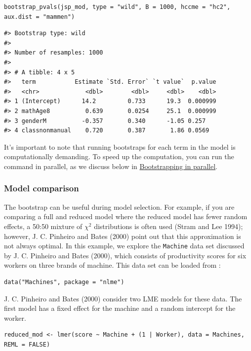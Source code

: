 \begin{verbatim}
bootstrap_pvals(jsp_mod, type = "wild", B = 1000, hccme = "hc2", aux.dist = "mammen")
\end{verbatim}

\begin{verbatim}
#> Bootstrap type: wild 
#> 
#> Number of resamples: 1000 
#> 
#> # A tibble: 4 x 5
#>   term           Estimate `Std. Error` `t value`  p.value
#>   <chr>             <dbl>        <dbl>     <dbl>    <dbl>
#> 1 (Intercept)      14.2         0.733      19.3  0.000999
#> 2 mathAge8          0.639       0.0254     25.1  0.000999
#> 3 genderM          -0.357       0.340      -1.05 0.257   
#> 4 classnonmanual    0.720       0.387       1.86 0.0569
\end{verbatim}

It's important to note that running bootstraps for each term in the model is computationally demanding. To speed up the computation, you can run the command in parallel, as we discuss below in \protect\hyperlink{bootstrapping-in-parallel}{Bootstrapping in parallel}.

\hypertarget{model-comparison}{%
\subsubsection{Model comparison}\label{model-comparison}}

The bootstrap can be useful during model selection.
For example, if you are comparing a full and reduced model where the reduced model has fewer random effects, a 50:50 mixture of \(\chi^2\) distributions is often used (Stram and Lee 1994); however, J. C. Pinheiro and Bates (2000) point out that this approximation is not always optimal. In this example, we explore the \texttt{Machine} data set discussed by J. C. Pinheiro and Bates (2000), which consists of productivity scores for six workers on three brands of machine. This data set can be loaded from :

\begin{verbatim}
data("Machines", package = "nlme")
\end{verbatim}

J. C. Pinheiro and Bates (2000) consider two LME models for these data. The first model has a fixed effect for the machine and a random intercept for the worker.

\begin{verbatim}
reduced_mod <- lmer(score ~ Machine + (1 | Worker), data = Machines, REML = FALSE)
\end{verbatim}

